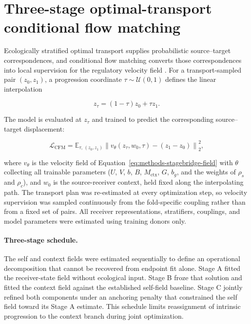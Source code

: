 \section{Three-stage optimal-transport conditional flow matching}
\label{sec:methods-training}

Ecologically stratified optimal transport supplies probabilistic
source--target correspondences, and conditional flow matching converts those
correspondences into local supervision for the regulatory velocity field
\autocite{Lipman2022-ns,Bunne2022-go}. For a transport-sampled pair
\((z_0,z_1)\), a progression coordinate
\(\tau\sim\mathcal{U}(0,1)\) defines the linear interpolation

\begin{equation}
z_\tau=(1-\tau)z_0+\tau z_1.
\label{eq:methods-cfm-interpolant}
\end{equation}

The model is evaluated at \(z_\tau\) and trained to predict the corresponding
source--target displacement:

\begin{equation}
\mathcal{L}_{\mathrm{CFM}}
=
\mathbb{E}_{\tau,\,(z_0,z_1)}
\left\lVert
v_{\theta}(z_\tau,w_0,\tau)
-
(z_1-z_0)
\right\rVert_2^2,
\label{eq:methods-general-cfm-loss}
\end{equation}

where \(v_\theta\) is the velocity field of
Equation~\ref{eq:methods-stagebridge-field} with \(\theta\) collecting all
trainable parameters (\(U\), \(V\), \(b\), \(B\), \(M_{\mathrm{ctx}}\), \(G\),
\(b_g\), and the weights of \(\rho_s\) and \(\rho_c\)), and \(w_0\) is the
source-receiver context, held fixed along the interpolating path. The transport plan was re-estimated at every optimization step, so
velocity supervision was sampled continuously from the fold-specific coupling
rather than from a fixed set of pairs. All receiver representations,
stratifiers, couplings, and model parameters were estimated using training
donors only.

\paragraph{Three-stage schedule.}
The self and context fields were estimated sequentially to define an operational
decomposition that cannot be recovered from endpoint fit alone. Stage A fitted
the receiver-state field without ecological input. Stage B froze that solution
and fitted the context field against the established self-field baseline. Stage
C jointly refined both components under an anchoring penalty that constrained
the self field toward its Stage A estimate. This schedule limits reassignment of
intrinsic progression to the context branch during joint optimization.

